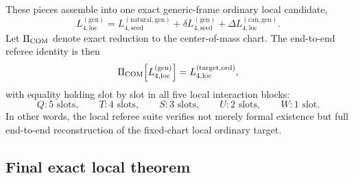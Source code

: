 \documentclass[11pt]{article}
\begin{document}
These pieces assemble into one exact generic-frame ordinary local candidate,
\begin{equation}
\boxed{
L_{4,\mathrm{loc}}^{(\mathrm{gen})}
=
L_{4,\mathrm{seed}}^{(\mathrm{natural,gen})}
+
\delta L_{4,\mathrm{seed}}^{(\mathrm{gen})}
+
\Delta L_{4,\mathrm{loc}}^{(\mathrm{can,gen})}.
}
\label{eq:4pn-local-generic-ordinary-candidate}
\end{equation}
Let $\Pi_{\rm COM}$ denote exact reduction to the center-of-mass chart.  The end-to-end
referee identity is then
\begin{equation}
\Pi_{\rm COM}\!\left[L_{4,\mathrm{loc}}^{(\mathrm{gen})}\right]
=
L_{4,\mathrm{loc}}^{(\mathrm{target,ord})},
\label{eq:4pn-local-referee-identity}
\end{equation}
with equality holding slot by slot in all five local interaction blocks:
\[
Q:5\text{ slots},
\qquad
T:4\text{ slots},
\qquad
S:3\text{ slots},
\qquad
U:2\text{ slots},
\qquad
W:1\text{ slot}.
\]
In other words, the local referee suite verifies not merely formal existence but
full end-to-end reconstruction of the fixed-chart local ordinary target.

\subsection{Final exact local theorem}
\label{sec:local-final}
\end{document}
